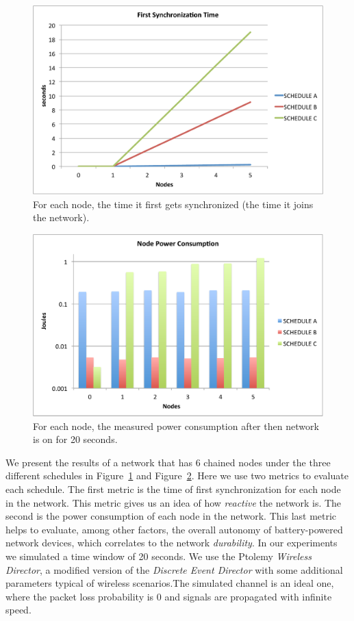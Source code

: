 \begin{figure}[t]
\centering
\includegraphics[width=0.7\columnwidth]{figures/synch_time_sched_big}
\caption{\small For each node, the time it first gets synchronized (the time it joins the network).}
\label{fig:time_sync}
\end{figure}

\begin{figure}[t]
\centering
\includegraphics[width=0.7\columnwidth]{figures/power_cons_big}
\caption{\small For each node, the measured power consumption after then network is on for 20 seconds.}
\label{fig:power_evaluation}
\end{figure}

We present the results of a network that has 6 chained nodes under the three different schedules in Figure~\ref{fig:time_sync} and Figure~\ref{fig:power_evaluation}. Here we use two metrics to evaluate each schedule. The first metric is the time of first synchronization for each node in the network. This metric gives us an idea of how \emph{reactive} the network is. The second is the power consumption of each node in the network. This last metric helps to evaluate, among other factors, the overall autonomy of battery-powered network devices, which correlates to the network {\em durability}.
In our experiments we simulated a time window of 20 seconds. We use the Ptolemy \emph{Wireless Director}, a modified version of the \emph{Discrete Event Director} with some additional parameters typical of wireless scenarios.The simulated channel is an ideal one, where the packet loss probability is 0 and signals are propagated with infinite speed.

